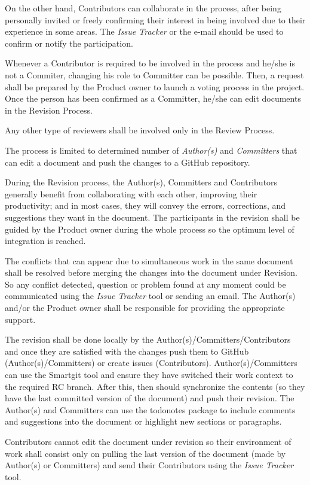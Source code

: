 \documentclass{template/openetcs_article}
\begin{document}
On the other hand, Contributors can collaborate in the process, after being personally invited or freely confirming their interest in being involved due to their experience in some areas. The {\it Issue Tracker} or the e-mail should be used to confirm or notify the participation.  

Whenever a Contributor is required to be involved in the process and he/she is not a Commiter, changing his role to Committer can be possible. Then, a request shall be prepared by the Product owner to launch a voting process in the project. Once the person has been confirmed as a Committer, he/she can edit documents in the Revision Process. 

Any other type of reviewers shall be involved only in the Review Process. 

The process is limited to determined number of {\it Author(s)} and {\it Committers} that can edit a document and push the changes to a GitHub repository. 

During the Revision process, the Author(s), Committers and Contributors generally benefit
from collaborating with each other, improving their productivity; and in most cases, they will convey the errors, corrections, and suggestions they want in the document. The participants in the revision shall be guided by the Product owner during the whole process so the optimum level of integration is reached. 

The conflicts that can appear due to simultaneous work in the same document shall be resolved before merging the changes into the document under Revision. So any conflict detected, question or problem found at any moment could be communicated using the {\it Issue Tracker} tool or sending an email. The Author(s) and/or the Product owner shall be responsible for providing the appropriate support.

The revision shall be done locally by the Author(s)/Committers/Contributors and once they are satisfied with the changes push them to GitHub (Author(s)/Committers) or create issues (Contributors). Author(s)/Committers can use the Smartgit tool and ensure they have switched their work context to the required RC branch. After this, then should synchronize the contents (so they have the last committed version of the document) and push their revision. The Author(s) and Committers can use the todonotes package to include comments and suggestions into the document or highlight new sections or paragraphs.

Contributors cannot edit the document under revision so their environment of work shall consist only on pulling the last version of the document (made by Author(s) or Committers) and send their Contributors using the {\it Issue Tracker} tool. 
\end{document}
